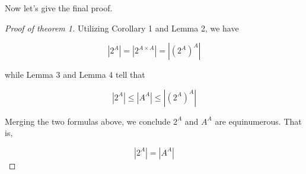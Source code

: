 \documentclass[12pt]{article}
\begin{document}
	Now let's give the final proof.
	
	\begin{proof}[Proof of theorem 1]
		
		Utilizing Corollary 1 and Lemma 2, we have
		
		$$|2^A|=|2^{A\times A}|=|(2^A)^ A|$$
		
		while Lemma 3 and Lemma 4 tell that
		
		$$|2^A|\le |A^A|\le |(2^A)^A|$$
		
		Merging the two formulas above, we conclude $2^A$ and $A^A$ are equinumerous. That is, 
		
		$$|2^A|=|A^A|$$
		
	\end{proof}
	
\end{document}
